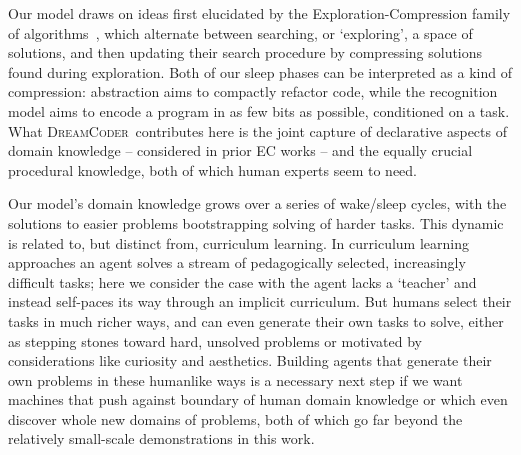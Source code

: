 \documentclass{article}
\newcommand{\system}{\textsc{DreamCoder}~}
\newcommand{\systemEnding}{\textsc{DreamCoder}}
\begin{document}
Our model draws on ideas first elucidated by the
Exploration-Compression family of algorithms~\cite{Dechter:2013:BLV:2540128.2540316,ecc,lazaro2019beyond,DBLP:conf/icml/LiangJK10,solomonoff1989system,schmidhuber2004optimal,ozkural2011teraflop},
which alternate
between searching, or `exploring', a space of solutions, and then
updating their search procedure by compressing solutions found during
exploration.  Both of our sleep phases can be interpreted as a kind of
compression: abstraction aims to compactly refactor code, while the
recognition model aims to encode a program in as few bits as possible,
conditioned on a task. What \system contributes here is the joint capture of
declarative aspects of domain knowledge -- considered in prior EC works -- and
the equally crucial procedural knowledge,
both of which human experts seem to need.







Our model's domain knowledge grows over a series of wake/sleep cycles,
with the solutions to easier problems bootstrapping
solving of harder tasks.
This dynamic is related to, but distinct from, curriculum learning. In curriculum learning approaches an agent solves a stream of pedagogically selected, increasingly difficult tasks; here we consider the case with the agent lacks a `teacher' and instead self-paces its way through an implicit curriculum.
But humans select their tasks in much richer ways,
and can even generate their own tasks to solve,
either as stepping stones toward hard, unsolved problems or motivated by considerations like curiosity and aesthetics.
Building agents that generate their own problems in these humanlike ways is a necessary next step
if we want machines that push against boundary of human domain knowledge or which even discover whole new domains of problems,
both of which go far beyond the relatively small-scale demonstrations in this work.
\end{document}
